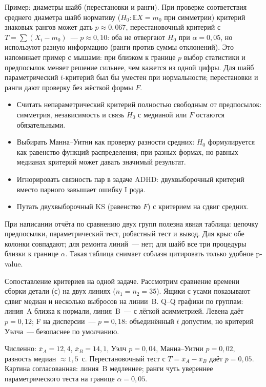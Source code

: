 Пример: диаметры шайб (перестановки и ранги). При проверке соответствия среднего диаметра шайб нормативу ($H_0\colon \mathbb EX=m_0$ при симметрии) критерий знаковых рангов может дать $p\approx 0{,}067$, перестановочный критерий с $T=\sum(X_i-m_0)$~--- $p\approx 0{,}10$: оба не отвергают $H_0$ при $\alpha=0{,}05$, но используют разную информацию (ранги против суммы отклонений).
Это напоминает пример с мышами: при близком к границе $p$ выбор статистики и предпосылок меняет решение сильнее, чем кажется из одной цифры.
Для шайб параметрический $t$-критерий был бы уместен при нормальности; перестановки и ранги дают проверку без жёсткой формы $F$.

\begin{itemize}
 \item Считать непараметрический критерий полностью свободным от предпосылок: симметрия, независимость и связь $H_0$ с медианой или $F$ остаются обязательными.
 \item Выбирать Манна--Уитни как проверку разности средних:
 $H_0$ формулируется как равенство функций распределения; при разных формах, но равных медианах критерий может давать значимый результат.
 \item Игнорировать связность пар в задаче ADHD: двухвыборочный
 критерий вместо парного завышает ошибку I рода.
 \item Путать двухвыборочный KS (равенство $F$) с критерием на сдвиг средних.
\end{itemize}
При написании отчёта по сравнению двух групп полезна явная таблица: цепочку предпосылки, параметрический тест, робастный тест и вывод. Для крыс обе колонки совпадают; для ремонта линий~--- нет; для шайб все три процедуры близки к границе $\alpha$. Такая таблица снимает соблазн цитировать только удобное p-value.

Сопоставление критериев на одной задаче. Рассмотрим сравнение времени сборки детали (с) на двух линиях ($n_1=n_2=35$).
Ящики с усами показывают сдвиг медиан и несколько выбросов на линии~B.
Q--Q графики по группам: линия~A близка к нормали, линия~B~--- с лёгкой асимметрией. Левена даёт $p=0{,}12$; F на дисперсии~--- $p=0{,}18$: объединённый $t$ допустим, но критерий Уэлча~--- безопаснее по умолчанию.

Численно: $\bar x_A=12{,}4$, $\bar x_B=14{,}1$, Уэлч $p=0{,}04$, Манна--Уитни $p=0{,}02$, разность медиан $\approx 1{,}5$~с. Перестановочный тест с $T=\bar x_A-\bar x_B$ даёт $p=0{,}05$. Картина согласованная: линия~B медленнее; ранги чуть увереннее параметрического теста на границе $\alpha=0{,}05$.

